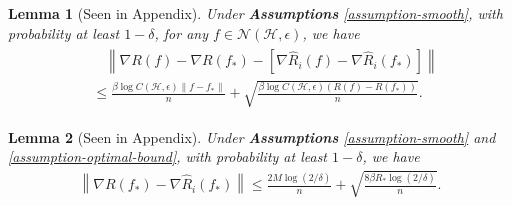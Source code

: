 \documentclass{article}
\newtheorem{lemma}{Lemma}
\newtheorem{theorem}{Theorem}
\begin{document}
\begin{lemma}[Seen in Appendix]
\label{lemma-nablaR-nablahat}
  Under \textbf{Assumptions} \ref{assumption-smooth}, with probability at least $1-\delta$,
  for any $f\in\mathcal{N}(\mathcal{H},\epsilon)$,
  we have
  \begin{align}
  \label{equation-nabalRR-empRR}
  \begin{aligned}
    &~~~~\left\|\nabla R(f)-\nabla R(f_\ast)-[\nabla \hat{R}_i(f)-\nabla \hat{R}_i(f_\ast)]\right\| \\
   &\leq \frac{\beta \log C(\mathcal{H},\epsilon)\|f-f_\ast\|}{n}+\sqrt{\frac{\beta \log C(\mathcal{H},\epsilon)(R(f)-R(f_\ast))}{n}}.
  \end{aligned}
  \end{align}
\end{lemma}


\begin{lemma}[Seen in Appendix]
\label{lemma-second-ff}
 Under \textbf{Assumptions} \ref{assumption-smooth} and \ref{assumption-optimal-bound},
 with probability at least $1-\delta$, we have
  \begin{align}
  \label{equation-nablaR-nablaempR}
    \left\|\nabla R(f_\ast)-\nabla \hat{R}_i(f_\ast)\right\|\leq \frac{2M\log(2/\delta)}{n}+\sqrt{\frac{8\beta R_\ast\log(2/\delta)}{n}}.
  \end{align}
\end{lemma}


\end{document}
